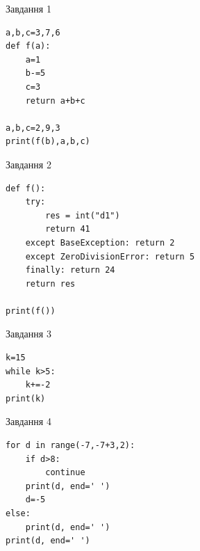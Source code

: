 \documentclass[12pt, ukrainian]{article}
\begin{document}
{{{\vspace{5mm} \begin{minipage}[t]{8.5cm}
               
{\begin{center}Завдання {1}\end{center}}
\vspace{-6mm}

\begin{verbatim}
a,b,c=3,7,6
def f(a):
    a=1
    b-=5
    c=3
    return a+b+c

a,b,c=2,9,3
print(f(b),a,b,c)
\end{verbatim}


\vspace{5mm}
               
{\begin{center}Завдання {2}\end{center}}
\vspace{-6mm}

\begin{verbatim}
def f():
    try:
        res = int("d1")
        return 41
    except BaseException: return 2
    except ZeroDivisionError: return 5
    finally: return 24
    return res

print(f())
\end{verbatim}


\vspace{5mm}
               
{\begin{center}Завдання {3}\end{center}}
\vspace{-6mm}

\begin{verbatim}
k=15
while k>5:
    k+=-2
print(k)
\end{verbatim}


\end{minipage}
\vline \hspace{6mm}
\begin{minipage}[t]{10.7cm}
               
{\begin{center}Завдання {4}\end{center}}
\vspace{-6mm}

\begin{verbatim}
for d in range(-7,-7+3,2):
    if d>8:
        continue
    print(d, end=' ')
    d=-5
else:
    print(d, end=' ')
print(d, end=' ')
\end{verbatim}



\end{minipage}}}}
\end{document}
